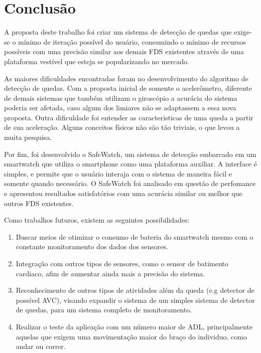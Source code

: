 \chapter{Conclusão}
\label{cap:conclusão}

A proposta deste trabalho foi criar um sistema de detecção de quedas que exige-se o mínimo de iteração possível do usuário, consumindo o mínimo de recursos possíveis com uma precisão similar aos demais \ac{FDS} existentes através de uma plataforma vestível que esteja se popularizando no mercado. 

As maiores dificuldades encontradas foram no desenvolvimento do algoritmo de detecção de quedas. Com a proposta inicial de somente o acelerômetro, diferente de demais sistemas que também utilizam o giroscópio a acurácia do sistema poderia ser afetada, caso algum dos limiares não se adaptassem a essa nova proposta. Outra dificuldade foi entender as caracteristicas de uma queda a partir de sua aceleração. Alguns conceitos físicos não são tão triviais, o que levou a muita pesquisa.  

Por fim, foi desenvolvido o SafeWatch, um sistema de detecção embarcado em um smartwatch que utiliza o smartphone como uma plataforma auxiliar. A interface é simples, e permite que o usuário interaja com o sistema de maneira fácil e somente quando necessário. O SafeWatch foi analisado em questão de perfomance e apresentou resultados satisfatórios com uma acurácia similar ou melhor que outros \ac{FDS} existentes.

Como trabalhos futuros, existem as seguintes possibilidades:

	\begin{enumerate}
		\item Buscar meios de otimizar o consumo de bateria do smartwatch mesmo com o constante monitoramento dos dados dos sensores.
		\item Integração com outros tipos de sensores, como o sensor de batimento cardiaco, afim de aumentar ainda mais a precisão do sistema.
		\item Reconhecimento de outros tipos de atividades além da queda (e.g detector de possível AVC),  visando expandir o sistema de um simples sistema de detector de quedas, para um sistema completo de monitoramento. 
		\item Realizar o teste da aplicação com um número maior de \ac{ADL}, principalmente aquelas que exigem uma movimentação maior do braço do individuo, como andar ou correr. 
 
	\end{enumerate}



